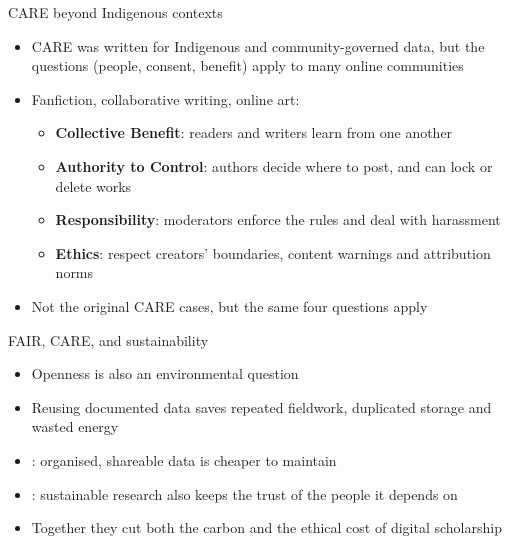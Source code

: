 \documentclass[aspectratio=169]{beamer}
\begin{document}
\begin{frame}{CARE beyond Indigenous contexts}
\begin{itemize}
  \item CARE was written for Indigenous and community-governed data, but the questions (people, consent, benefit) apply to many online communities
  \item Fanfiction, collaborative writing, online art:
    \begin{itemize}
      \item \textbf{Collective Benefit}: readers and writers learn from one another
      \item \textbf{Authority to Control}: authors decide where to post, and can lock or delete works
      \item \textbf{Responsibility}: moderators enforce the rules and deal with harassment
      \item \textbf{Ethics}: respect creators' boundaries, content warnings and attribution norms
    \end{itemize}
  \item Not the original CARE cases, but the same four questions apply
\end{itemize}
\end{frame}

\begin{frame}{FAIR, CARE, and sustainability}
\begin{itemize}
  \item Openness is also an environmental question
  \item Reusing documented data saves repeated fieldwork, duplicated storage and wasted energy
  \item {}: organised, shareable data is cheaper to maintain
  \item {}: sustainable research also keeps the trust of the people it depends on
  \item Together they cut both the carbon and the ethical cost of digital scholarship
\end{itemize}
\end{frame}
\end{document}
